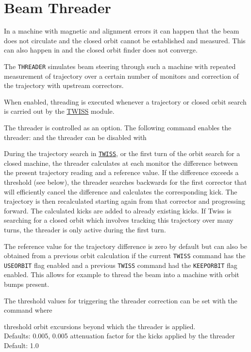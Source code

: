%

\section{Beam Threader}
\label{sec:threader}

In a machine with magnetic and alignment errors it can happen that the
beam does not circulate and the closed orbit cannot be established and
measured. This can also happen in \madx and the closed orbit finder does
not converge. 

The \texttt{THREADER} simulates beam steering through such a machine
with repeated measurement of trajectory over a certain number of
monitors and correction of the trajectory with upstream correctors.   

When enabled, threading is executed whenever a trajectory or closed
orbit search is carried out by the \hyperref[chap:twiss]{TWISS}
module.   

The threader is controlled as an option. 
The following \madx command enables the threader:
and the threader can be disabled with

During the trajectory search in \hyperref[chap:twiss]{\texttt{TWISS}}, or the first 
turn of the orbit search for a closed machine, the threader calculates at each
monitor the difference between the present trajectory reading and a
reference value.
If the difference exceeds a threshold (see below), the threader searches
backwards for the first corrector that will efficiently cancel the
difference and calculates the corresponding kick. The trajectory is then
recalculated starting again from that corrector and progressing
forward. The calculated kicks are added to already existing kicks. If
Twiss is searching for a closed orbit which involves tracking this
trajectory over many turns, the threader is only active during the first
turn.  

The reference value for the trajectory difference is zero by default but
can also be obtained from a previous orbit calculation if the current
\texttt{TWISS} command has the \texttt{USEORBIT} flag enabled and a previous
\texttt{TWISS} command had the \texttt{KEEPORBIT} flag enabled. This allows
for example to thread the beam into a machine with orbit bumps present.  

The threshold values for triggering the threader correction can be set
with the command  
where 
\begin{madlist}
   threshold orbit excursions beyond which the threader
  is applied. \\ Defaults: 0.005, 0.005
   attenuation factor for the kicks applied by the threader
  \\ Default: 1.0 
\end{madlist}

